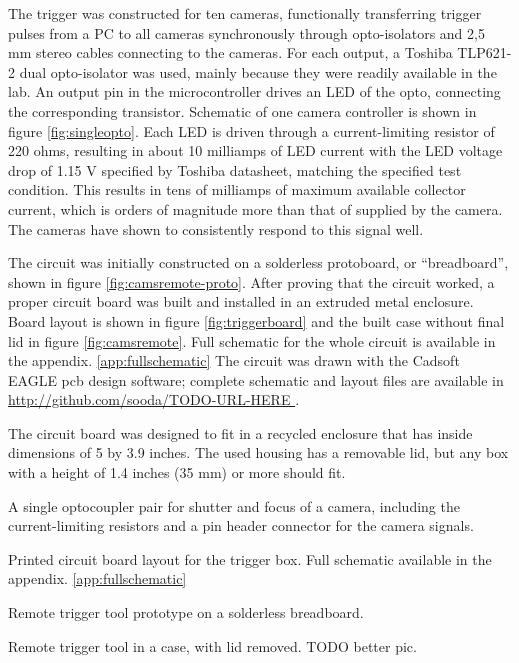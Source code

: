 The trigger was constructed for ten cameras, functionally transferring trigger pulses from a PC to all cameras synchronously through opto-isolators and 2,5 mm stereo cables connecting to the cameras.
For each output, a Toshiba TLP621-2 dual opto-isolator was used, mainly because they were readily available in the lab.
An output pin in the microcontroller drives an LED of the opto, connecting the corresponding transistor.
Schematic of one camera controller is shown in figure \ref{fig:singleopto}.
Each LED is driven through a current-limiting resistor of 220 ohms, resulting in about 10 milliamps of LED current with the LED voltage drop of 1.15 V specified by Toshiba datasheet, matching the specified test condition.
This results in tens of milliamps of maximum available collector current, which is orders of magnitude more than that of supplied by the camera. %
The cameras have shown to consistently respond to this signal well.

The circuit was initially constructed on a solderless protoboard, or ``breadboard'', shown in figure \ref{fig:camsremote-proto}.
After proving that the circuit worked, a proper circuit board was built and installed in an extruded metal enclosure.
Board layout is shown in figure \ref{fig:triggerboard} and the built case without final lid in figure \ref{fig:camsremote}.
Full schematic for the whole circuit is available in the appendix. \ref{app:fullschematic}
The circuit was drawn with the Cadsoft EAGLE pcb design software; complete schematic and layout files are available in \url { http://github.com/sooda/TODO-URL-HERE }.

The circuit board was designed to fit in a recycled enclosure that has inside dimensions of 5 by 3.9 inches.
The used housing has a removable lid, but any box with a height of 1.4 inches (35 mm) or more should fit.

{A single optocoupler pair for shutter and focus of a camera, including the current-limiting resistors and a pin header connector for the camera signals.}

{Printed circuit board layout for the trigger box. Full schematic available in the appendix. \ref{app:fullschematic}}

{Remote trigger tool prototype on a solderless breadboard.}

{Remote trigger tool in a case, with lid removed. TODO better pic.}

